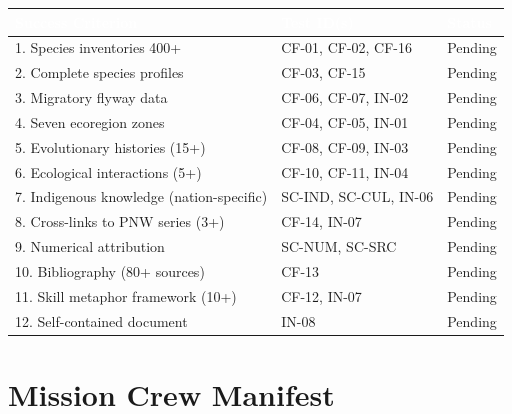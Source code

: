 \documentclass[11pt,letterpaper]{article}
\newcommand{\tableheader}[1]{\textbf{\sffamily\textcolor{white}{#1}}}
\begin{document}
\begin{center}
\small
\begin{tabularx}{\textwidth}{XL{3cm}C{1.3cm}}
\toprule
{}
\tableheader{Success Criterion} & \tableheader{Test ID(s)} & \tableheader{Status} \\
. Species inventories 400+ & CF-01, CF-02, CF-16 & Pending \\
2. Complete species profiles & CF-03, CF-15 & Pending \\
3. Migratory flyway data & CF-06, CF-07, IN-02 & Pending \\
4. Seven ecoregion zones & CF-04, CF-05, IN-01 & Pending \\
5. Evolutionary histories (15+) & CF-08, CF-09, IN-03 & Pending \\
6. Ecological interactions (5+) & CF-10, CF-11, IN-04 & Pending \\
7. Indigenous knowledge (nation-specific) & SC-IND, SC-CUL, IN-06 & Pending \\
8. Cross-links to PNW series (3+) & CF-14, IN-07 & Pending \\
9. Numerical attribution & SC-NUM, SC-SRC & Pending \\
10. Bibliography (80+ sources) & CF-13 & Pending \\
11. Skill metaphor framework (10+) & CF-12, IN-07 & Pending \\
12. Self-contained document & IN-08 & Pending \\
\bottomrule
\end{tabularx}
\end{center}

\section{Mission Crew Manifest}
\end{document}
